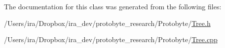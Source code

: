 The documentation for this class was generated from the following files\-:\begin{DoxyCompactItemize}
\item 
/\-Users/ira/\-Dropbox/ira\-\_\-dev/protobyte\-\_\-research/\-Protobyte/\hyperlink{_tree_8h}{Tree.\-h}\item 
/\-Users/ira/\-Dropbox/ira\-\_\-dev/protobyte\-\_\-research/\-Protobyte/\hyperlink{_tree_8cpp}{Tree.\-cpp}\end{DoxyCompactItemize}
